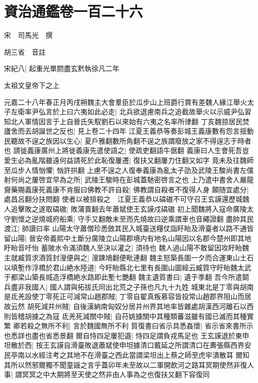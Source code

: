 \chapter{資治通鑑卷一百二十六}
宋　司馬光　撰

胡三省　音註

宋紀八|{
	起重光單閼盡玄黓執徐凡二年}


太祖文皇帝下之上

元嘉二十八年春正月丙戌朔魏主大會羣臣於瓜步山上班爵行賞有差魏人緣江舉火太子左衛率尹弘言於上曰六夷如此必走|{
	北兵欲退慮南兵之追截故舉火以示威尹弘習知北人軍情因言于上自晉氏失馭劉石以來始有六夷之名率所律翻}
丁亥魏掠居民焚廬舍而去胡誕世之反也|{
	見上卷二十四年}
江夏王義恭等奏彭城王義康數有怨言揺動民聽故不逞之族因以生心|{
	夏戶雅翻數所角翻不逞之族謂廢放之家不得逞志于時者也}
請徙義康廣州上將徙義康先遣使語之|{
	使疏吏翻語牛倨翻}
義康曰人生會死吾豈愛生必為亂階雖遠何益請死於此恥復屢遷|{
	復扶又翻屢力住翻又如字}
竟未及往魏師至瓜步人情忷懼|{
	忷許拱翻}
上慮不逞之人復奉義康為亂太子劭及武陵王駿尚書左僕射何尚之屢啓宜早為之所|{
	武陵王駿時在彭城蓋馳密啓言之也}
上乃遣中書舍人嚴龍齎藥賜義康死義康不肯服曰佛教不許自殺|{
	佛教謂自殺者不復得人身}
願随宜處分|{
	處昌呂翻分扶問翻}
使者以被揜殺之　江夏王義恭以碻磝不可守召王玄謨還歷城魏人追擊敗之遂取碻磝|{
	敗蒲賣翻去年蕭斌使王玄謨戍碻磝}
初上聞魏將入寇命廣陵太守劉懷之逆燒城府船乘|{
	守手又翻敵未至而先燒故曰逆乘謂車也音繩證翻}
盡帥其民渡江|{
	帥讀曰率}
山陽太守蕭僧珍悉斂其民入城臺送糧仗詣盱眙及滑臺者以路不通皆留山陽|{
	晉安帝義熙中土斷分廣陵立山陽郡境内有地名山陽因以名郡今楚州即其地盱眙音吁怡}
蓄陂水令滿須魏人至決以灌之|{
	須待也}
魏人過山陽不敢留因攻盱眙魏主就臧質求酒質封溲便與之|{
	溲踈鳩翻便毗連翻}
魏主怒築長圍一夕而合運東山土石以填塹作浮橋於君山絶水陸道|{
	今盱眙縣北七里有長圍山圖經云臧質守盱眙魏太武于都梁山築長城造浮橋絶水路即此塹七艷翻}
魏主遺質書曰|{
	遺于季翻}
吾今所遣鬬兵盡非我國人|{
	國人謂與拓拔氏同出北荒之子孫也凡九十九姓}
城東北是丁零與胡南是氐羌設使丁零死正可減常山趙郡賊|{
	丁零自翟真叛慕容皆投常山趙郡界阻山而居故云然}
胡死減并州賊|{
	自後漢納南匈奴分居并州界其地率皆雜處胡漢西河離石以西則皆稽胡據之為寇}
氐羌死減關中賊|{
	自苻姚據關中其種類蕃滋雖有國已滅而其種實繁}
卿若殺之無所不利|{
	言於魏國無所不利}
質復書曰省示具悉姦懷|{
	省示省來書所示也悉詳也盡也省悉景翻}
爾自恃四足屢犯邉|{
	恃四足謂負戎馬足也}
王玄謨退於東申坦散於西|{
	按王玄謨自滑臺敗退蕭斌使申坦據清口戴延之所謂清口在夀張縣西界安民亭南以水經注考之其地不在滑臺之西此當謂梁坦出上蔡之師至虎牢潰散耳}
爾知其所以然邪爾獨不聞童謡之言乎蓋卯年未至故以二軍開飲河之路耳冥期使然非復人事|{
	謂冥冥之中大期將至天使之然非由人事為之也復扶又翻下容復同}
